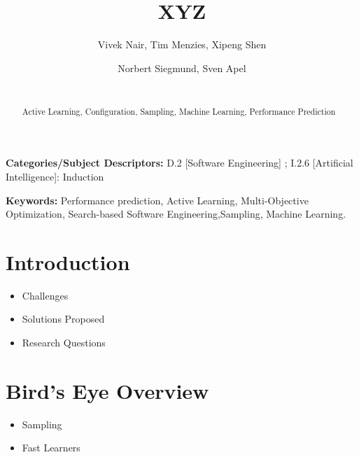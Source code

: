\documentclass{sig-alternative}
\newcommand{\bi}{\begin{itemize}[leftmargin=0.4cm]}
\newcommand{\ei}{\end{itemize}}
\begin{document}
\title{ XYZ}
\author{
        \alignauthor Vivek Nair, Tim Menzies, Xipeng Shen 
    \and  
        \alignauthor Norbert Siegmund, Sven Apel \\
        \\
       }

\maketitle 
\thispagestyle{plain}
\pagestyle{plain}
\begin{abstract}
Active Learning, Configuration, Sampling, Machine Learning, Performance Prediction


\end{abstract}

\vspace{1mm}
\noindent
{\bf Categories/Subject Descriptors:} 
D.2 [Software Engineering] ;
I.2.6 [Artificial Intelligence]: Induction

 
\vspace{1mm}
\noindent
{\bf Keywords:} Performance prediction, Active Learning, 
Multi-Objective Optimization,
Search-based Software Engineering,Sampling, Machine Learning.

 
 
\section{Introduction}
 
\bi
    \item{Challenges}
    \item{Solutions Proposed}
    \item{Research Questions}
\ei
\section{Bird's Eye Overview}
\bi
    \item{Sampling}
    \item{Fast Learners}
\ei
\end{document}
